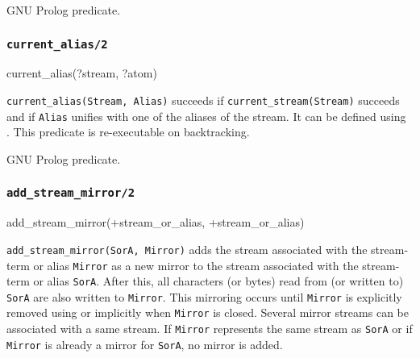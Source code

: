 \Portability

GNU Prolog predicate.

\subsubsection{\texttt{current\_alias/2}}

\begin{TemplatesOneCol}
current\_alias(?stream, ?atom)

\end{TemplatesOneCol}

\Description

\texttt{current\_alias(Stream, Alias)} succeeds if
\texttt{current\_stream(Stream)} succeeds  and if
\texttt{Alias} unifies with one of the aliases of the stream. It can be
defined using  . This
predicate is re-executable on backtracking.

\begin{PlErrors}



\end{PlErrors}

\Portability

GNU Prolog predicate.

\subsubsection{\texttt{add\_stream\_mirror/2}}
\label{add-stream-mirror/2}

\begin{TemplatesOneCol}
add\_stream\_mirror(+stream\_or\_alias, +stream\_or\_alias)

\end{TemplatesOneCol}

\Description

\texttt{add\_stream\_mirror(SorA, Mirror)} adds the stream associated with
the stream-term or alias \texttt{Mirror} as a new mirror to the stream
associated with the stream-term or alias \texttt{SorA}. After this, all
characters (or bytes) read from (or written to) \texttt{SorA} are also
written to \texttt{Mirror}. This mirroring occurs until \texttt{Mirror} is
explicitly removed using 
 or implicitly when \texttt{Mirror} is closed.
Several mirror streams can be associated with a same stream. If \texttt{Mirror}
represents the same stream as \texttt{SorA} or if \texttt{Mirror} is already
a mirror for \texttt{SorA}, no mirror is added.

